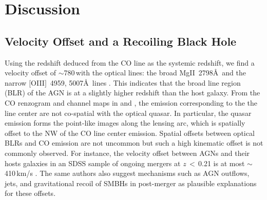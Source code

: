 \documentclass[]{emulateapj}
\begin{document}


\section{Discussion} \label{sec:diss}
\subsection{Velocity Offset and a Recoiling Black Hole}
Using the redshift deduced from the CO line 
as the systemic redshift, we find
a velocity offset of $\sim$780\,\kms with the optical lines:
the broad Mg{\scriptsize II}~2798\AA\ and the narrow 
$[$O{\scriptsize III}$]$~4959, 5007\AA\ lines .
This indicates that the broad line region (BLR) of the AGN is at a
slightly higher redshift than the host galaxy.
From the CO renzogram and channel maps in  and , the emission 
corresponding to the the line center are not co-spatial
with the optical quasar. In particular, the quasar emission forms 
the point-like images along the lensing arc, which is 
spatially offset to the NW
of the CO line center emission.
Spatial offsets between optical BLRs and CO emission are not uncommon
but such a high kinematic offset is not commonly observed.
For instance, the
velocity offset between AGNs and their hosts galaxies in 
an SDSS sample of ongoing mergers at $z$\,$<$\,0.21 is at most $\sim$410\,km/s \citep{Comerford14a}.
The same authors also suggest mechanisms
such as AGN outflows, jets, and gravitational recoil of SMBHs in post-merger
as plausible explanations for these offsets.
\end{document}
